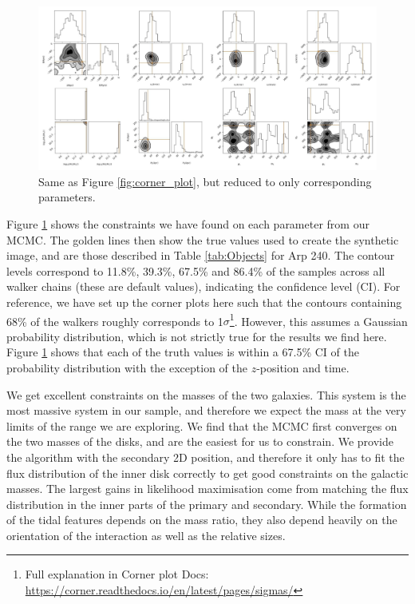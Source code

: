\begin{figure}
\centering
\includegraphics[width=\textwidth]{Chapter1/figures/Arp240-red-corner.pdf}
\caption[Same as Figure \ref{fig:corner_plot}, but reduced to only corresponding parameters.]{Same as Figure \ref{fig:corner_plot}, but reduced to only corresponding parameters.}
\label{fig:arp240_corner_plot}
\end{figure}

Figure \ref{fig:arp240_corner_plot} shows the constraints we have found on each parameter from our MCMC. The golden lines then show the true values used to create the synthetic image, and are those described in Table \ref{tab:Objects} for Arp 240. The contour levels correspond to 11.8\%, 39.3\%, 67.5\% and 86.4\% of the samples across all walker chains (these are default values), indicating the confidence level (CI). For reference, we have set up the corner plots here such that the contours containing 68\% of the walkers roughly corresponds to 1$\sigma$\footnote{Full explanation in Corner plot Docs: \url{https://corner.readthedocs.io/en/latest/pages/sigmas/}}. However, this assumes a Gaussian probability distribution, which is not strictly true for the results we find here. Figure \ref{fig:arp240_corner_plot} shows that each of the truth values is within a 67.5\% CI of the probability distribution with the exception of the $z$-position and time.

We get excellent constraints on the masses of the two galaxies. This system is the most massive system in our sample, and therefore we expect the mass at the very limits of the range we are exploring. We find that the MCMC first converges on the two masses of the disks, and are the easiest for us to constrain. We provide the algorithm with the secondary 2D position, and therefore it only has to fit the flux distribution of the inner disk correctly to get good constraints on the galactic masses. The largest gains in likelihood maximisation come from matching the flux distribution in the inner parts of the primary and secondary. While the formation of the tidal features depends on the mass ratio, they also depend heavily on the orientation of the interaction as well as the relative sizes.

